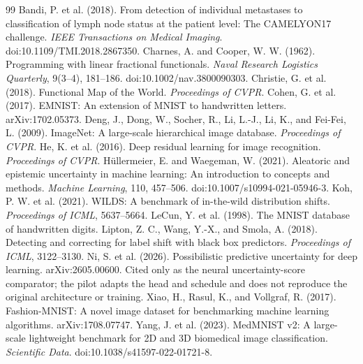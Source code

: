 \documentclass[11pt]{article}
\begin{document}

\begin{thebibliography}{99}
 Bandi, P. et al. (2018). From detection of individual metastases to classification of lymph node status at the patient level: The CAMELYON17 challenge. \emph{IEEE Transactions on Medical Imaging}. doi:10.1109/TMI.2018.2867350.
 Charnes, A. and Cooper, W. W. (1962). Programming with linear fractional functionals. \emph{Naval Research Logistics Quarterly}, 9(3--4), 181--186. doi:10.1002/nav.3800090303.
 Christie, G. et al. (2018). Functional Map of the World. \emph{Proceedings of CVPR}.
 Cohen, G. et al. (2017). EMNIST: An extension of MNIST to handwritten letters. arXiv:1702.05373.
 Deng, J., Dong, W., Socher, R., Li, L.-J., Li, K., and Fei-Fei, L. (2009). ImageNet: A large-scale hierarchical image database. \emph{Proceedings of CVPR}.
 He, K. et al. (2016). Deep residual learning for image recognition. \emph{Proceedings of CVPR}.
 H\"ullermeier, E. and Waegeman, W. (2021). Aleatoric and epistemic uncertainty in machine learning: An introduction to concepts and methods. \emph{Machine Learning}, 110, 457--506. doi:10.1007/s10994-021-05946-3.
 Koh, P. W. et al. (2021). WILDS: A benchmark of in-the-wild distribution shifts. \emph{Proceedings of ICML}, 5637--5664.
 LeCun, Y. et al. (1998). The MNIST database of handwritten digits.
 Lipton, Z. C., Wang, Y.-X., and Smola, A. (2018). Detecting and correcting for label shift with black box predictors. \emph{Proceedings of ICML}, 3122--3130.
 Ni, S. et al. (2026). Possibilistic predictive uncertainty for deep learning. arXiv:2605.00600. Cited only as the neural uncertainty-score comparator; the pilot adapts the head and schedule and does not reproduce the original architecture or training.
 Xiao, H., Rasul, K., and Vollgraf, R. (2017). Fashion-MNIST: A novel image dataset for benchmarking machine learning algorithms. arXiv:1708.07747.
 Yang, J. et al. (2023). MedMNIST v2: A large-scale lightweight benchmark for 2D and 3D biomedical image classification. \emph{Scientific Data}. doi:10.1038/s41597-022-01721-8.
\end{thebibliography}
\end{document}
